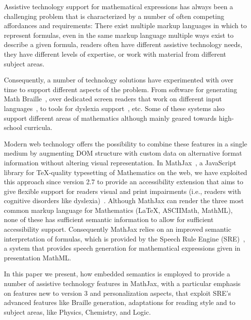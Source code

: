 \documentclass{sig-alternate}
\begin{document}
Assistive technology support for mathematical expressions has always been a
challenging problem that is characterized by a number of often competing
affordances and requirements: There exist multiple markup languages in which to
represent formulas, even in the same markup language multiple ways exist to
describe a given formula, readers often have different assistive technology
needs, they have different levels of expertise, or work with material from
different subject areas.

Consequently, a number of technology solutions have experimented with over time
to support different aspects of the problem. From software for generating Math
Braille~\cite{maddox2007mathematical}, over dedicated screen readers that work
on different input languages~\cite{raman1994aster,soiffer2005mathplayer}, to
tools for dyslexia support~\cite{equatio}, etc. Some of these systems also
support different areas of mathematics although mainly geared towards
high-school curricula.

Modern web technology offers the possibility to combine these features in a
single medium by augmenting DOM structure with custom data on alternative format
information without altering visual representation. In
MathJax~\cite{MathJax2.7}, a JavaScript library for TeX-quality typesetting of
Mathematics on the web, we have exploited this approach since version 2.7 to
provide an accessibility extension that aims to give flexible support for
readers visual and print impairments (i.e., readers with cognitive disorders
like dyslexia)~\cite{cervone2016towards}.  Although MathJax can render the three
most common markup language for Mathematics ({\LaTeX}, ASCIIMath, MathML),
none of these has sufficient semantic information to allow for sufficient
accessibility support. Consequently MathJax relies on an improved semantic
interpretation of formulas, which is provided by the Speech Rule Engine
(SRE)~\cite{SRE}, a system that provides speech generation for mathematical
expressions given in presentation MathML.

In this paper we present, how embedded semantics is employed to provide a number
of assistive technology features in MathJax, with a particular emphasis on
features new to version 3 and personalization aspects, that exploit SRE's
advanced features like Braille generation, adaptations for reading style and to
subject areas, like Physics, Chemistry, and Logic.


\end{document}
